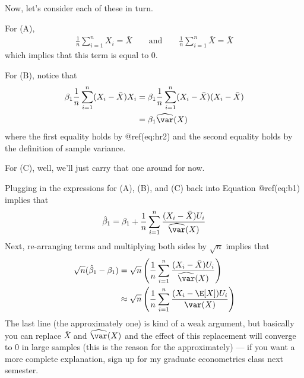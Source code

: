 \documentclass[
  letterpaper,
  DIV=11,
  numbers=noendperiod]{scrreprt}
\begin{document}
Now, let's consider each of these in turn.

For (A), \begin{align*}
  \frac{1}{n} \sum_{i=1}^n X_i = \bar{X} \qquad \textrm{and} \qquad \frac{1}{n} \sum_{i=1}^n \bar{X} = \bar{X}
\end{align*} which implies that this term is equal to 0.

For (B), notice that \begin{align*}
  \beta_1 \frac{1}{n} \sum_{i=1}^n (X_i - \bar{X}) X_i &= \beta_1 \frac{1}{n} \sum_{i=1}^n (X_i - \bar{X}) (X_i - \bar{X}) \\
  &= \beta_1 \widehat{\var}(X)
\end{align*} where the first equality holds by @ref(eq:hr2) and the
second equality holds by the definition of sample variance.

For (C), well, we'll just carry that one around for now.

Plugging in the expressions for (A), (B), and (C) back into Equation
@ref(eq:b1) implies that \begin{align*}
  \hat{\beta}_1 = \beta_1 + \frac{1}{n} \sum_{i=1}^n \frac{(X_i - \bar{X}) U_i}{\widehat{\var}(X)}
\end{align*} Next, re-arranging terms and multiplying both sides by
\(\sqrt{n}\) implies that \begin{align*}
  \sqrt{n}(\hat{\beta}_1 - \beta_1) &= \sqrt{n} \left(\frac{1}{n} \sum_{i=1}^n \frac{(X_i - \bar{X}) U_i}{\widehat{\var}(X)}\right) \\
  & \approx \sqrt{n} \left(\frac{1}{n} \sum_{i=1}^n \frac{(X_i - \E[X]) U_i}{\var(X)}\right)
\end{align*} The last line (the approximately one) is kind of a weak
argument, but basically you can replace \(\bar{X}\) and
\(\widehat{\var}(X)\) and the effect of this replacement will converge
to 0 in large samples (this is the reason for the approximately) --- if
you want a more complete explanation, sign up for my graduate
econometrics class next semester.
\end{document}
